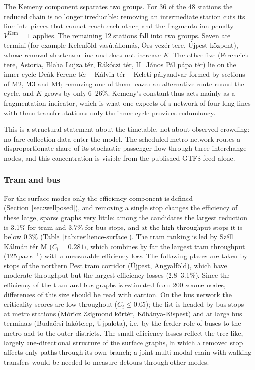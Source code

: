 \documentclass[12pt,a4paper]{article}
\theoremstyle{plain}
\theoremstyle{definition}
\theoremstyle{remark}
\begin{document}


The Kemeny component separates two groups.  For 36 of the 48 stations the
reduced chain is no longer irreducible: removing an intermediate station cuts
its line into pieces that cannot reach each other, and the fragmentation
penalty $V^{\mathrm{Kem}}=1$ applies.  The remaining 12 stations fall into two
groups.  Seven are termini (for example Kelenf\"old vas\'ut\'allom\'as,
\"Ors vez\'er tere, \'Ujpest-k\"ozpont), whose removal shortens a line and
does not increase $K$.  The other five (Ferenciek tere, Astoria, Blaha Lujza
t\'er, R\'ak\'oczi t\'er, II.~J\'anos P\'al p\'apa t\'er) lie on the inner
cycle De\'ak Ferenc t\'er -- K\'alvin t\'er -- Keleti p\'alyaudvar formed by
sections of M2, M3 and M4; removing one of them leaves an alternative route
round the cycle, and $K$ grows by only 6--26\%.  Kemeny's constant thus acts
mainly as a fragmentation indicator, which is what one expects of a network
of four long lines with three transfer stations: only the inner cycle provides
redundancy.

This is a structural statement about the timetable, not about observed
crowding: no fare-collection data enter the model.  The scheduled metro network
routes a disproportionate share of its stochastic passenger flow through three
interchange nodes, and this concentration is visible from the published GTFS
feed alone.

\subsubsection{Tram and bus}
\label{sec:finding2}

For the surface modes only the efficiency component is defined
(Section~\ref{sec:wellposed}), and removing a single stop changes the
efficiency of these large, sparse graphs very little: among the candidates the
largest reduction is 3.1\% for tram and 3.7\% for bus stops, and at the
high-throughput stops it is below 0.3\% (Table~\ref{tab:resilience-surface}).
The tram ranking is led by Sz\'ell K\'alm\'an t\'er M ($C_i=0.281$), which
combines by far the largest tram throughput (125\,pax\,s$^{-1}$) with a
measurable efficiency loss.  The following places are taken by stops of the
northern Pest tram corridor (\'Ujpest, Angyalf\"old), which have moderate
throughput but the largest efficiency losses (2.8--3.1\%).  Since the
efficiency of the tram and bus graphs is estimated from 200 source nodes,
differences of this size should be read with caution.  On the bus network the criticality scores are low
throughout ($C_i\le0.05$); the list is headed by bus stops at metro stations
(M\'oricz Zsigmond k\"ort\'er, K\H{o}b\'anya-Kispest) and at large bus
terminals (Buda\"orsi lak\'otelep, \'Ujpalota), i.e.\ by the feeder role of
buses to the metro and to the outer districts.  The small
efficiency losses reflect the tree-like, largely one-directional structure of
the surface graphs, in which a removed stop affects only paths through its own
branch; a joint multi-modal chain with walking transfers would be needed to
measure detours through other modes.
\end{document}
